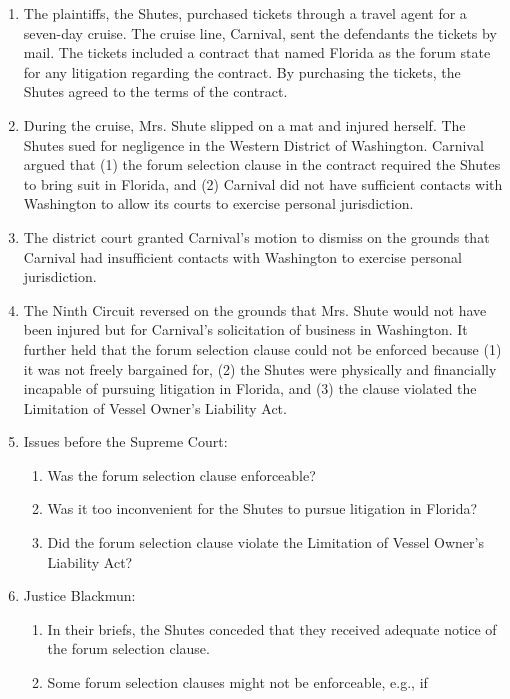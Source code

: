 \begin{enumerate}
    \item The plaintiffs, the Shutes, purchased tickets through a travel agent 
    for a seven-day cruise. The cruise line, Carnival, sent the defendants the 
    tickets by mail. The tickets included a contract that named Florida as the 
    forum state for any litigation regarding the contract. By purchasing the 
    tickets, the Shutes agreed to the terms of the contract.
    \item During the cruise, Mrs. Shute slipped on a mat and injured herself.  
    The Shutes sued for negligence in the Western District of Washington.  
    Carnival argued that (1) the forum selection clause in the contract 
    required the Shutes to bring suit in Florida, and (2) Carnival did not 
    have sufficient contacts with Washington to allow its courts to exercise 
    personal jurisdiction.
    \item The district court granted Carnival's motion to dismiss on the 
    grounds that Carnival had insufficient contacts with Washington to 
    exercise personal jurisdiction.
    \item The Ninth Circuit reversed on the grounds that Mrs. Shute would not 
    have been injured but for Carnival's solicitation of business in 
    Washington. It further held that the forum selection clause could not be 
    enforced because (1) it was not freely bargained for, (2) the Shutes were 
    physically and financially incapable of pursuing litigation in Florida, 
    and (3) the clause violated the Limitation of Vessel Owner's Liability 
    Act.
    \item Issues before the Supreme Court:
    \begin{enumerate}
        \item Was the forum selection clause enforceable?
        \item Was it too inconvenient for the Shutes to pursue litigation in 
        Florida?
        \item Did the forum selection clause violate the Limitation of Vessel 
        Owner's Liability Act?
    \end{enumerate}
    \item Justice Blackmun:
    \begin{enumerate}
        \item In their briefs, the Shutes conceded that they received adequate 
        notice of the forum selection clause.
        \item Some forum selection clauses might not be enforceable, e.g., if 

\end{enumerate}
\end{enumerate}
